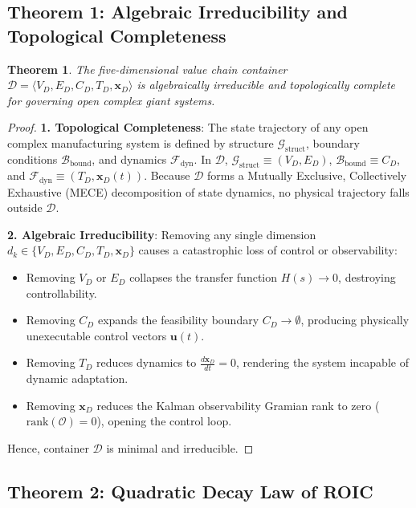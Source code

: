 \documentclass[11pt,a4paper]{article}
\newtheorem{theorem}{Theorem}[section]
\begin{document}
\subsection{Theorem 1: Algebraic Irreducibility and Topological Completeness}

\begin{theorem}
The five-dimensional value chain container $\mathcal{D} = \langle V_D, E_D, C_D, T_D, \mathbf{x}_D \rangle$ is algebraically irreducible and topologically complete for governing open complex giant systems.
\end{theorem}

\begin{proof}
\textbf{1. Topological Completeness}: The state trajectory of any open complex manufacturing system is defined by structure $\mathcal{G}_{\text{struct}}$, boundary conditions $\mathcal{B}_{\text{bound}}$, and dynamics $\mathcal{F}_{\text{dyn}}$. In $\mathcal{D}$, $\mathcal{G}_{\text{struct}} \equiv (V_D, E_D)$, $\mathcal{B}_{\text{bound}} \equiv C_D$, and $\mathcal{F}_{\text{dyn}} \equiv (T_D, \mathbf{x}_D(t))$. Because $\mathcal{D}$ forms a Mutually Exclusive, Collectively Exhaustive (MECE) decomposition of state dynamics, no physical trajectory falls outside $\mathcal{D}$.

\textbf{2. Algebraic Irreducibility}: Removing any single dimension $d_k \in \{V_D, E_D, C_D, T_D, \mathbf{x}_D\}$ causes a catastrophic loss of control or observability:
\begin{itemize}
    \item Removing $V_D$ or $E_D$ collapses the transfer function $H(s) \to 0$, destroying controllability.
    \item Removing $C_D$ expands the feasibility boundary $C_D \to \emptyset$, producing physically unexecutable control vectors $\mathbf{u}(t)$.
    \item Removing $T_D$ reduces dynamics to $\frac{d\mathbf{x}_D}{dt} = 0$, rendering the system incapable of dynamic adaptation.
    \item Removing $\mathbf{x}_D$ reduces the Kalman observability Gramian rank to zero ($\text{rank}(\mathcal{O}) = 0$), opening the control loop.
\end{itemize}
Hence, container $\mathcal{D}$ is minimal and irreducible.
\end{proof}

\subsection{Theorem 2: Quadratic Decay Law of ROIC}
\end{document}
